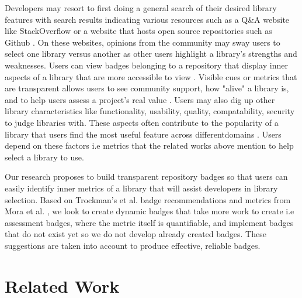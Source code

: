 \documentclass[12pt, letterpaper]{article}
\begin{document}
Developers may resort to first doing a general search of their desired library features with 
search results indicating
various resources such as a Q\&A website like StackOverflow \cite{stackoverflow} or 
a website that hosts open source repositories such as Github \cite{github}. On
these websites, opinions from the community
\cite{opinerarticle} may sway users to select one library versus another as other users highlight
a library's strengths and weaknesses. 
Users can view badges belonging to a repository that display inner aspects of a library that are
more accessible to view
\cite{githubbadges}. Visible cues or metrics that are transparent allows users
to see community support, how "alive" a library is, and to help users assess a project's real value
\cite{metrics,transparency}. Users may also dig up other library characteristics like functionality, usability,
quality, compatability, security to judge libraries with\cite{githubbadges,metrics,librarytrends}. 
These aspects often contribute to the popularity of a library
\cite{librarytrends, apiwave} that users find the most useful feature across differentdomains \cite{empiricalmetrics}.
Users depend on these factors i.e metrics that the related works above mention to help select a library to use. 


Our research proposes to build transparent repository badges so that users can 
easily identify inner metrics of a library
that will assist developers in library selection. 
Based on Trockman's et al. \cite{githubbadges} badge recommendations and metrics from Mora et al. \cite{metrics},
we look to create 
dynamic badges that take more work to create i.e assessment badges, where the metric itself is quantifiable, and
implement badges that do not exist yet so we do not develop already created badges.
These suggestions are taken into account to produce effective, reliable
badges.


\section{Related Work}
\end{document}
